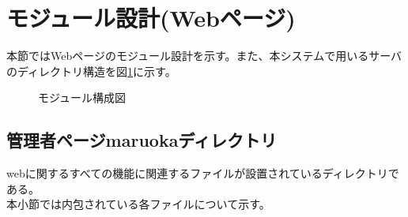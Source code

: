 \documentclass[a4j]{jarticle}
\begin{document}
\section{モジュール設計(Webページ)}

本節ではWebページのモジュール設計を示す。また、本システムで用いるサーバのディレクトリ構造を図\ref {tab:oonishimoj}に示す。

\begin{figure}[H]
\begin{center}
\caption{モジュール構成図}
\label{tab:oonishimoj}
\end{center}
\end{figure}
\subsection{管理者ページmaruokaディレクトリ}
webに関するすべての機能に関連するファイルが設置されているディレクトリである。\\
本小節では内包されている各ファイルについて示す。
\end{document}
